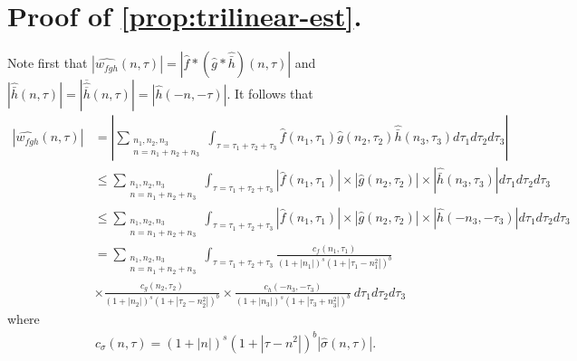 \documentclass[12pt,reqno]{amsart}
\numberwithin{equation}{section}  %
\numberwithin{figure}{section}
\newcommand{\wh}{\widehat}
\theoremstyle{plain}
\theoremstyle{definition}
\theoremstyle{remark}
\begin{document}
\section{Proof of \autoref{prop:trilinear-est}.}
%
%
%
%
%
%
Note first that $|\wh{w_{fgh}}(n, \tau) |  = | \wh{f} * ( \wh{g} 
* \wh{\bar h})(n, \tau)|$ and $| \wh{\bar{h}}(n, \tau) | = |\overline{ \wh{\overline{h}} 
}(n, \tau)| = | \wh{h}(-n, -\tau) |$. It follows that
%
%
\begin{equation}
	\label{non-lin-rep}
	\begin{split}
		| \wh{w_{fgh}}(n, \tau)|
		& = | \sum_{\substack{n_1,n_2,n_3\\n = n_1 + n_2 + n_3}}  \int_{\tau=\tau_1 + \tau_2 + \tau_3} \wh{f}\left( n_1,  \tau_1 
\right) \wh{g}\left( n_2, \tau_2  
\right) \wh{\bar h}\left( n_3, \tau_3 \right) d \tau_1 d \tau_2 d \tau_3 |
\\
& \le \sum_{\substack{n_1,n_2,n_3\\n = n_1 + n_2 + n_3}}  \int_{\tau=\tau_1 + \tau_2 + \tau_3} | \wh{f}\left( n_1, \tau_1 
\right) | \times  | \wh{g}\left( n_2, \tau_2 
\right) | \times | \wh{\bar h}\left( n_3, \tau_3 \right) | d \tau_1 d \tau_2 d 
\tau_3
\\
& \le \sum_{\substack{n_1,n_2,n_3\\n = n_1 + n_2 + n_3}}  \int_{\tau=\tau_1 + \tau_2 + \tau_3} | \wh{f}\left( n_1, \tau_1 
\right) | \times | \wh{g}\left( n_2, \tau_2 
\right) | \times | \wh{h}\left( -n_3, - \tau_3 \right) | d \tau_1 d \tau_2 d 
\tau_3
\\
& = \sum_{\substack{n_1,n_2,n_3\\n = n_1 + n_2 + n_3}} \int_{\tau=\tau_1 + \tau_2 + \tau_3} \frac{c_f\left( n_1, \tau_1 
\right)}{\left (1 + |n_1| \right )^s \left( 1 + | \tau_1 - n_1^2 | \right)^{b}}
\\
& \times \frac{c_{g}\left( n_2, \tau_2 \right)}{\left (1 + |n_2| \right ) 
^s\left( 1 + | \tau_2 -  n_2^2| 
\right)^{b}}
 \times \frac{c_{h}\left( -n_3, -\tau_3 \right)}{\left (1 + |n_3| \right ) ^s\left( 1 + | 
\tau_3 + n_3^2 | \right)^{b}} \ d \tau_1 d \tau_2 d \tau_3
\end{split}
\end{equation}
%
%
where 
%
%
\begin{equation*}
	\begin{split}
		c_\sigma(n, \tau) = \left (1 + |n| \right ) ^s \left( 1 + | \tau - n^2 |  
		\right)^{b} | \wh{\sigma}\left( n, \tau \right) | .
	\end{split}
\end{equation*}
\end{document}
